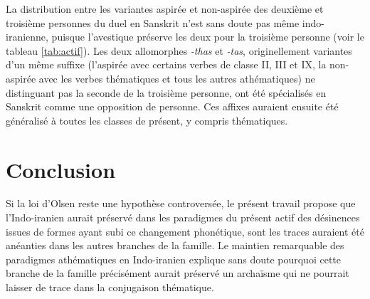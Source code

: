 \documentclass[oldfontcommands,oneside,a4paper,11pt]{article}
\newcommand{\ipa}[1]{{\phon\textit{#1}}} %
\begin{document}
La distribution entre les variantes aspirée et non-aspirée des deuxième et troisième personnes du duel en Sanskrit  n'est sans doute pas même indo-iranienne, puisque l'avestique préserve les deux pour la troisième personne (voir le tableau \ref{tab:actif}). Les deux allomorphes \ipa{-thas} et \ipa{-tas}, originellement variantes d'un même suffixe (l'aspirée avec certains verbes de classe II, III et IX, la non-aspirée avec les verbes thématiques et tous les autres athématiques) ne distinguant pas la seconde de la troisième personne, ont été spécialisés en Sanskrit comme une opposition de personne. Ces affixes auraient ensuite été généralisé à toutes les classes de présent, y compris thématiques.

\section*{Conclusion}
Si la loi d'Olsen reste une hypothèse controversée, le présent travail propose que l'Indo-iranien aurait préservé dans les paradigmes du présent actif des désinences issues de formes ayant subi ce changement phonétique, sont les traces auraient été anéanties dans les autres branches de la famille. Le maintien remarquable des paradigmes athématiques en Indo-iranien explique sans doute pourquoi cette branche de la famille précisément aurait préservé un archaïsme qui ne pourrait laisser de trace dans la conjugaison thématique. 



\end{document}
